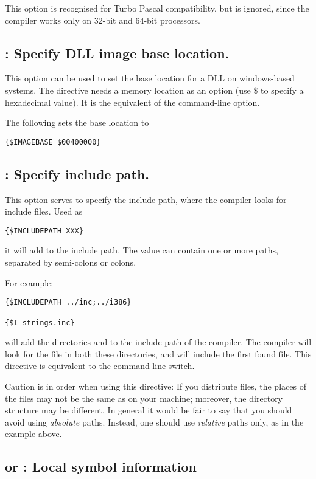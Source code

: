 This option is recognised for Turbo Pascal compatibility, but is ignored,
since the compiler works only on 32-bit and 64-bit processors.

\subsection{ : Specify DLL image base location.}
This option can be used to set the base location for a DLL on windows-based
systems. The directive needs a memory location as an option (use \$ to
specify a hexadecimal value). It is the equivalent of the  command-line option.

The following sets the base location to 
\begin{verbatim}
{$IMAGEBASE $00400000}
\end{verbatim}

\subsection{ : Specify include path.}

This option serves to specify the include path, where the compiler looks for
include files. Used as
\begin{verbatim}
{$INCLUDEPATH XXX}
\end{verbatim}
it will add  to the include path. The value  can contain one or more paths, 
separated by semi-colons or colons.

For example:
\begin{verbatim}
{$INCLUDEPATH ../inc;../i386}

{$I strings.inc}
\end{verbatim}

will add the directories  and  to the include
path of the compiler. The compiler will look for the file 
in both these directories, and will include the first found file. This directive is
equivalent to the  command line switch.

Caution is in order when using this directive: If you distribute files, the
places of the files may not be the same as on your machine; moreover, the
directory structure may be different. In general it would be fair to say
that you should avoid using {\em absolute} paths. Instead, one should use 
{\em relative} paths only, as in the example above. 

\subsection{ or  : Local symbol information}

